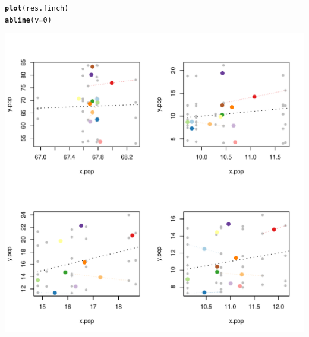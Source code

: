 \documentclass[12pt]{article}\usepackage[]{graphicx}\usepackage[]{color}
\makeatletter
\def\maxwidth{ %
  \ifdim\Gin@nat@width>\linewidth
    \linewidth
  \else
    \Gin@nat@width
  \fi
}
\newcommand{\hlnum}[1]{\textcolor[rgb]{0.686,0.059,0.569}{#1}}%
\newcommand{\hlstd}[1]{\textcolor[rgb]{0.345,0.345,0.345}{#1}}%
\newcommand{\hlkwc}[1]{\textcolor[rgb]{0.333,0.667,0.333}{#1}}%
\newcommand{\hlkwd}[1]{\textcolor[rgb]{0.737,0.353,0.396}{\textbf{#1}}}%
\newenvironment{kframe}{%
 \def\at@end@of@kframe{}%
 \ifinner\ifhmode%
  \def\at@end@of@kframe{\end{minipage}}%
  \begin{minipage}{\columnwidth}%
 \fi\fi%
 \def\FrameCommand##1{\hskip\@totalleftmargin \hskip-\fboxsep
 \colorbox{shadecolor}{##1}\hskip-\fboxsep
     \hskip-\linewidth \hskip-\@totalleftmargin \hskip\columnwidth}%
 \MakeFramed {\advance\hsize-\width
   \@totalleftmargin\z@ \linewidth\hsize
   \@setminipage}}%
 {\par\unskip\endMakeFramed%
 \at@end@of@kframe}
\newenvironment{knitrout}{}{} %
\makeatother
\begin{document}
\begin{knitrout}
\color{fgcolor}\begin{kframe}
\begin{alltt}
\hlkwd{plot}\hlstd{(res.finch)}
\hlkwd{abline}\hlstd{(}\hlkwc{v}\hlstd{=}\hlnum{0}\hlstd{)}
\end{alltt}
\end{kframe}

{\centering \includegraphics[width=\maxwidth]{figure/unnamed-chunk-29} 

}



\end{knitrout}
\end{document}
